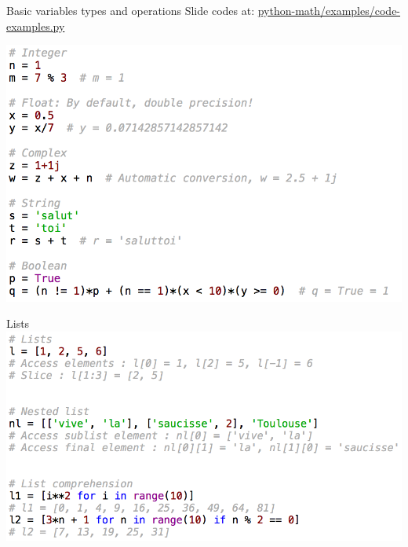 \documentclass[11pt,unknownkeysallowed,usenames,dvipsnames]{beamer}
\begin{document}
    
%       
%    
%    
%    
%    
%        
\begin{frame}{Basic variables types and operations}
    Slide codes at: 
    \href{https://gitlab.unige.ch/Thibaut.Lunet/python-math/tree/master/examples/code-examples.py}{python-math/examples/code-examples.py}
    
    \vspace*{5pt}
    \includegraphics[width=0.9\linewidth]{code-basic-variables}
\end{frame}



%    
%    
\begin{frame}{Lists}
    \includegraphics[width=0.9\linewidth]{code-lists}
\end{frame}
\end{document}
